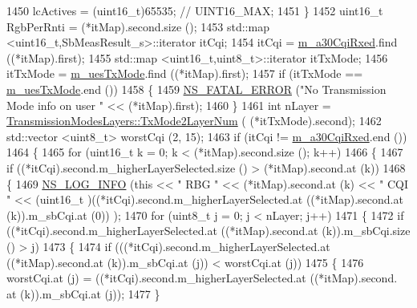 \begin{DoxyCode}
1450           lcActives = (uint16\_t)65535; \textcolor{comment}{// UINT16\_MAX;}
1451         \}
1452       uint16\_t RgbPerRnti = (*itMap).second.size ();
1453       std::map <uint16\_t,SbMeasResult\_s>::iterator itCqi;
1454       itCqi = \hyperlink{classns3_1_1FdTbfqFfMacScheduler_a2c52c04323552283ec3f14a7ce083bc2}{m\_a30CqiRxed}.find ((*itMap).first);
1455       std::map <uint16\_t,uint8\_t>::iterator itTxMode;
1456       itTxMode = \hyperlink{classns3_1_1FdTbfqFfMacScheduler_a08550374df1be10395aa320fc1722066}{m\_uesTxMode}.find ((*itMap).first);
1457       \textcolor{keywordflow}{if} (itTxMode == \hyperlink{classns3_1_1FdTbfqFfMacScheduler_a08550374df1be10395aa320fc1722066}{m\_uesTxMode}.end ())
1458         \{
1459           \hyperlink{group__fatal_ga5131d5e3f75d7d4cbfd706ac456fdc85}{NS\_FATAL\_ERROR} (\textcolor{stringliteral}{"No Transmission Mode info on user "} << (*itMap).first);
1460         \}
1461       \textcolor{keywordtype}{int} nLayer = \hyperlink{classns3_1_1TransmissionModesLayers_a31f608b7bfaa77440fe4cb85ad035329}{TransmissionModesLayers::TxMode2LayerNum} (
      (*itTxMode).second);
1462       std::vector <uint8\_t> worstCqi (2, 15);
1463       \textcolor{keywordflow}{if} (itCqi != \hyperlink{classns3_1_1FdTbfqFfMacScheduler_a2c52c04323552283ec3f14a7ce083bc2}{m\_a30CqiRxed}.end ())
1464         \{
1465           \textcolor{keywordflow}{for} (uint16\_t k = 0; k < (*itMap).second.size (); k++)
1466             \{
1467               \textcolor{keywordflow}{if} ((*itCqi).second.m\_higherLayerSelected.size () > (*itMap).second.at (k))
1468                 \{
1469                   \hyperlink{group__logging_gafbd73ee2cf9f26b319f49086d8e860fb}{NS\_LOG\_INFO} (\textcolor{keyword}{this} << \textcolor{stringliteral}{" RBG "} << (*itMap).second.at (k) << \textcolor{stringliteral}{" CQI "} << (uint16\_t
      )((*itCqi).second.m\_higherLayerSelected.at ((*itMap).second.at (k)).m\_sbCqi.at (0)) );
1470                   \textcolor{keywordflow}{for} (uint8\_t j = 0; j < nLayer; j++)
1471                     \{
1472                       \textcolor{keywordflow}{if} ((*itCqi).second.m\_higherLayerSelected.at ((*itMap).second.at (k)).m\_sbCqi.size ()
       > j)
1473                         \{
1474                           \textcolor{keywordflow}{if} (((*itCqi).second.m\_higherLayerSelected.at ((*itMap).second.at (k)).m\_sbCqi.at
       (j)) < worstCqi.at (j))
1475                             \{
1476                               worstCqi.at (j) = ((*itCqi).second.m\_higherLayerSelected.at ((*itMap).second.
      at (k)).m\_sbCqi.at (j));
1477                             \}

\end{DoxyCode}
